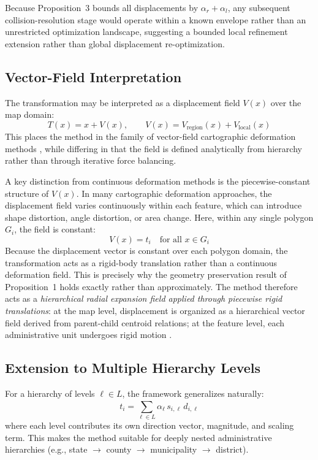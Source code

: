 \documentclass[12pt, a4paper]{article}
\numberwithin{equation}{section}
\begin{document}
Because Proposition~3 bounds all displacements by $\alpha_r + \alpha_l$, any subsequent collision-resolution stage would operate within a known envelope rather than an unrestricted optimization landscape, suggesting a bounded local refinement extension rather than global displacement re-optimization.

\subsection{Vector-Field Interpretation}

The transformation may be interpreted as a displacement field $V(x)$ over the map domain:
\begin{equation}
  T(x) = x + V(x), \qquad V(x) = V_{\text{region}}(x) + V_{\text{local}}(x)
  \label{eq:field}
\end{equation}
This places the method in the family of vector-field cartographic deformation methods \citep{ai2015, sun2020}, while differing in that the field is defined analytically from hierarchy rather than through iterative force balancing.

A key distinction from continuous deformation methods is the piecewise-constant structure of $V(x)$. In many cartographic deformation approaches, the displacement field varies continuously within each feature, which can introduce shape distortion, angle distortion, or area change. Here, within any single polygon $G_i$, the field is constant:
\begin{equation}
  V(x) = t_i \quad \text{for all } x \in G_i
  \label{eq:piecewise}
\end{equation}
Because the displacement vector is constant over each polygon domain, the transformation acts as a rigid-body translation rather than a continuous deformation field. This is precisely why the geometry preservation result of Proposition~1 holds exactly rather than approximately. The method therefore acts as a \emph{hierarchical radial expansion field applied through piecewise rigid translations}: at the map level, displacement is organized as a hierarchical vector field derived from parent-child centroid relations; at the feature level, each administrative unit undergoes rigid motion \citep{ngo2019, bouts2015}.

\subsection{Extension to Multiple Hierarchy Levels}

For a hierarchy of levels $\ell \in L$, the framework generalizes naturally:
\begin{equation}
  t_i = \sum_{\ell \in L} \alpha_\ell\, s_{i,\ell}\, \hat{d}_{i,\ell}
  \label{eq:multilevel}
\end{equation}
where each level contributes its own direction vector, magnitude, and scaling term. This makes the method suitable for deeply nested administrative hierarchies (e.g., state $\to$ county $\to$ municipality $\to$ district).
\end{document}
